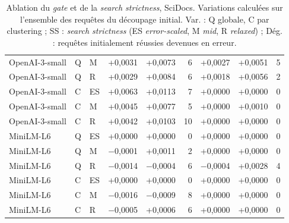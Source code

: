 \documentclass[a4paper,10pt]{article}
\begin{document}
\begin{table}[p]
\begin{tabular}{lllrrrrrr}
OpenAI-3-small & Q & M & +0,0031 & +0,0073 & 6 & +0,0027 & +0,0051 & 5 \\
OpenAI-3-small & Q & R & +0,0029 & +0,0084 & 6 & +0,0018 & +0,0056 & 2 \\
OpenAI-3-small & C & ES & +0,0063 & +0,0113 & 7 & +0,0000 & +0,0000 & 0 \\
OpenAI-3-small & C & M & +0,0045 & +0,0077 & 5 & +0,0000 & +0,0010 & 0 \\
OpenAI-3-small & C & R & +0,0042 & +0,0103 & 10 & +0,0000 & +0,0000 & 0 \\
\midrule
MiniLM-L6 & Q & ES & +0,0000 & +0,0000 & 0 & +0,0000 & +0,0000 & 0 \\
MiniLM-L6 & Q & M & $-$0,0001 & +0,0011 & 2 & +0,0000 & +0,0000 & 0 \\
MiniLM-L6 & Q & R & $-$0,0014 & $-$0,0004 & 6 & $-$0,0004 & +0,0028 & 4 \\
MiniLM-L6 & C & ES & +0,0000 & +0,0000 & 0 & +0,0000 & +0,0000 & 0 \\
MiniLM-L6 & C & M & $-$0,0016 & $-$0,0009 & 8 & +0,0000 & +0,0000 & 0 \\
MiniLM-L6 & C & R & $-$0,0005 & +0,0006 & 6 & +0,0000 & +0,0000 & 0 \\
\bottomrule
\end{tabular}
\caption{Ablation du \textit{gate} et de la \textit{search strictness}, SciDocs. Variations calculées sur l'ensemble des requêtes du découpage initial. Var. : Q globale, C par clustering ; SS : \textit{search strictness} (ES \textit{error-scaled}, M \textit{mid}, R \textit{relaxed}) ; Dég. : requêtes initialement réussies devenues en erreur.}
\label{tab:s-ablation-scidocs}
\end{table}
\end{document}
